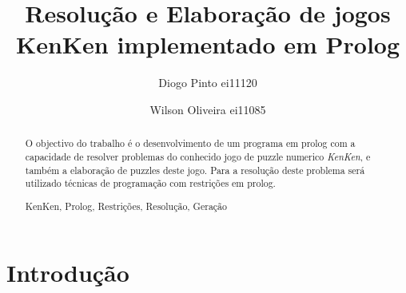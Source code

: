 \documentclass[runningheads,a4paper]{llncs}
\newcommand{\keywords}[1]{\par\addvspace\baselineskip
\noindent\keywordname\enspace\ignorespaces#1}
\begin{document}
\mainmatter  %

\title{Resolução e Elaboração de jogos KenKen implementado em Prolog}


%
%
\author{Diogo Pinto ei11120
\and Wilson Oliveira ei11085}
%


%
%

\maketitle


\begin{abstract}
O objectivo do trabalho é o desenvolvimento de um programa em prolog com a capacidade de resolver problemas do conhecido jogo de puzzle numerico \emph{KenKen}, e também a elaboração de puzzles deste jogo. Para a resolução deste problema será utilizado técnicas de programação com restrições em prolog. 
\keywords{KenKen, Prolog, Restrições, Resolução, Geração}
\end{abstract}

\newpage
\section{Introdução}
\end{document}
